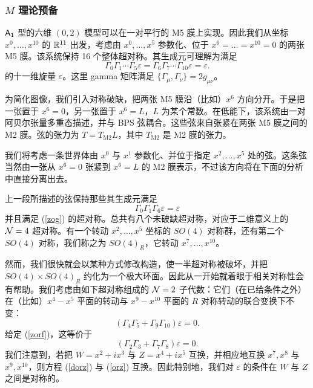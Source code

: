 \subsubsection{$M$ 理论预备}\label{prelims}

$\sf A_1$ 型的六维 $(0,2)$ 模型可以在一对平行的 M5 膜上实现。因此我们从坐标 $x^0,\dots,x^{10}$ 的 ${\mathbb R}^{11}$ 出发，考虑由 $x^0,\dots,x^5$ 参数化、位于 $x^6=\dots=x^{10}=0$ 的两张 M5 膜。该系统保持 16 个整体超对称。其生成元可理解为满足
\begin{equation}\label{zog}\Gamma_0\Gamma_1\cdots\Gamma_5\varepsilon=\Gamma_6\Gamma_7\cdots
 \Gamma_{10}\varepsilon=\varepsilon. \end{equation}
的十一维旋量 $\varepsilon$。这里 gamma 矩阵满足 $\{\Gamma_\mu,\Gamma_\nu\}=2g_{\mu\nu}$。


为简化图像，我们引入对称破缺，把两张 M5 膜沿（比如）$x^6$ 方向分开。于是把一张置于 $x^6=0$，另一张置于 $x^6=L$，$L$ 为某个常数。在低能下，该系统由一对阿贝尔张量多重态描述，并与 BPS 弦耦合。这些弦来自张紧在两张 M5 膜之间的 M2 膜。弦的张力为 $T=T_{\mathrm{M2}}L$，其中 $T_{\mathrm{M2}}$ 是 M2 膜的张力。

我们将考虑一条世界体由 $x^0$ 与 $x^1$ 参数化、并位于指定 $x^2,\dots,x^5$ 处的弦。这条弦当然由一张从 $x^6=0$ 张紧到 $x^6=L$ 的 M2 膜表示，不过该方向将在下面的分析中直接分离出去。

上一段所描述的弦保持那些其生成元满足
\begin{equation}\label{zorf}\Gamma_0\Gamma_1\Gamma_6\varepsilon=
 \varepsilon\end{equation}
并且满足 (\ref{zog}) 的超对称。总共有八个未破缺超对称，对应于二维意义上的 ${\mathcal N}=4$ 超对称。有一个转动 $x^2,\dots, x^5$ 坐标的 $SO(4)$ 对称群，还有第二个 $SO(4)$ 对称，我们称之为 $SO(4)_R$，它转动 $x^7,\dots,x^{10}$。


然而，我们很快就会以某种方式修改构造，使一半超对称被破坏，并把 $SO(4)\times SO(4)_R$ 约化为一个极大环面。因此从一开始就着眼于相关对称性会有帮助。我们考虑由如下超对称组成的 ${\mathcal N}=2$ 子代数：它们（在已给条件之外）在（比如）$x^4-x^5$ 平面的转动与 $x^9-x^{10}$ 平面的 $R$ 对称转动的联合变换下不变：
\begin{equation}\label{dorz}
\left(\Gamma_4\Gamma_5+\Gamma_9\Gamma_{10}\right)\varepsilon=0.
\end{equation}
给定 (\ref{zorf})，这等价于
\begin{equation}\label{orz}\left(\Gamma_2\Gamma_3+\Gamma_7\Gamma_8\right)\varepsilon=0.
\end{equation}
我们注意到，若把 $W=x^2+ix^3$ 与 $Z=x^4+ix^5$ 互换，并相应地互换 $x^7,x^8$ 与 $x^9,x^{10}$，则方程 (\ref{dorz}) 与 (\ref{orz}) 互换。因此特别地，我们对 $\varepsilon$ 的条件在 $W$ 与 $Z$ 之间是对称的。

